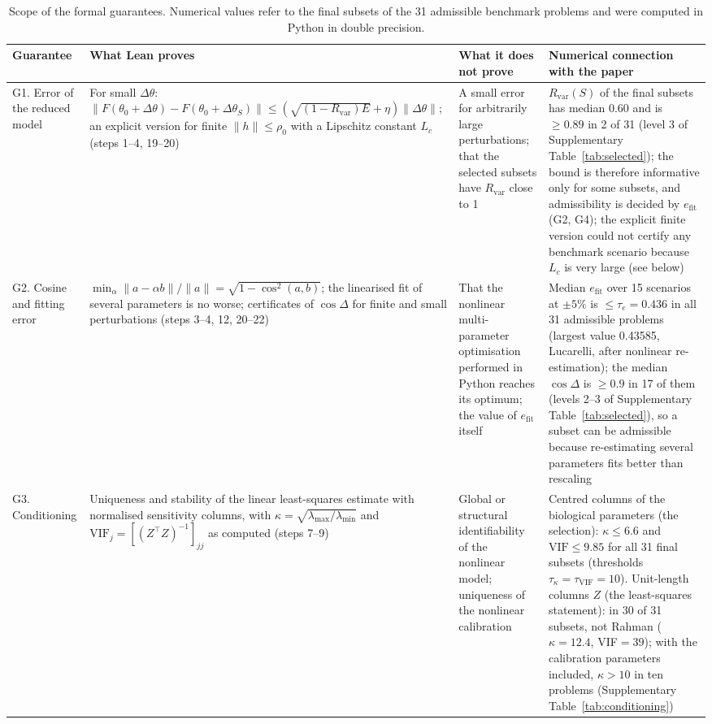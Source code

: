{\small
\begin{longtable}{@{}>{\raggedright\arraybackslash}p{2.0cm}>{\raggedright\arraybackslash}p{4.4cm}>{\raggedright\arraybackslash}p{4.2cm}>{\raggedright\arraybackslash}p{4.7cm}@{}}
\caption{Scope of the formal guarantees. Numerical values refer to the final subsets of the 31 admissible benchmark problems and were computed in Python in double precision.}\label{tab:scope}\\
\toprule
Guarantee & What Lean proves & What it does not prove & Numerical connection with the paper \\
\midrule
\endhead
G1. Error of the reduced model & For small $\Delta\theta$: $\|F(\theta_0{+}\Delta\theta)-F(\theta_0{+}\Delta\theta_S)\|\le(\sqrt{(1-R_{\mathrm{var}})E}+\eta)\|\Delta\theta\|$; an explicit version for finite $\|h\|\le\rho_0$ with a Lipschitz constant $L_c$ (steps 1--4, 19--20) & A small error for arbitrarily large perturbations; that the selected subsets have $R_{\mathrm{var}}$ close to 1 & $R_{\mathrm{var}}(S)$ of the final subsets has median 0.60 and is $\ge0.89$ in 2 of 31 (level 3 of Supplementary Table~\ref{tab:selected}); the bound is therefore informative only for some subsets, and admissibility is decided by $e_{\mathrm{fit}}$ (G2, G4); the explicit finite version could not certify any benchmark scenario because $L_c$ is very large (see below) \\
G2. Cosine and fitting error & $\min_\alpha\|a-\alpha b\|/\|a\|=\sqrt{1-\cos^2(a,b)}$; the linearised fit of several parameters is no worse; certificates of $\cos\Delta$ for finite and small perturbations (steps 3--4, 12, 20--22) & That the nonlinear multi-parameter optimisation performed in Python reaches its optimum; the value of $e_{\mathrm{fit}}$ itself & Median $e_{\mathrm{fit}}$ over 15 scenarios at $\pm5\%$ is $\le\tau_e=0.436$ in all 31 admissible problems (largest value 0.43585, Lucarelli, after nonlinear re-estimation); the median $\cos\Delta$ is $\ge0.9$ in 17 of them (levels 2--3 of Supplementary Table~\ref{tab:selected}), so a subset can be admissible because re-estimating several parameters fits better than rescaling \\
G3. Conditioning & Uniqueness and stability of the linear least-squares estimate with normalised sensitivity columns, with $\kappa=\sqrt{\lambda_{\max}/\lambda_{\min}}$ and $\mathrm{VIF}_j=[(Z^\top Z)^{-1}]_{jj}$ as computed (steps 7--9) & Global or structural identifiability of the nonlinear model; uniqueness of the nonlinear calibration & Centred columns of the biological parameters (the selection): $\kappa\le6.6$ and $\mathrm{VIF}\le9.85$ for all 31 final subsets (thresholds $\tau_\kappa=\tau_{\mathrm{VIF}}=10$). Unit-length columns $Z$ (the least-squares statement): in 30 of 31 subsets, not Rahman ($\kappa=12.4$, VIF$=39$); with the calibration parameters included, $\kappa>10$ in ten problems (Supplementary Table~\ref{tab:conditioning}) \\

\end{longtable}}
